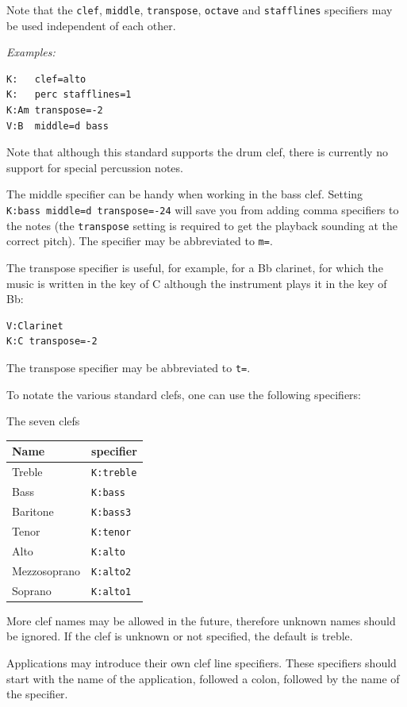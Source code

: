 \documentclass[oneside]{book}
\begin{document}
Note that the \texttt{clef}, \texttt{middle}, \texttt{transpose},
\texttt{octave} and \texttt{stafflines} specifiers may be used
independent of each other.

\emph{Examples:}

\begin{verbatim}
K:   clef=alto
K:   perc stafflines=1
K:Am transpose=-2
V:B  middle=d bass
\end{verbatim}

Note that although this standard supports the drum clef, there is
currently no support for special percussion notes.

The middle specifier can be handy when working in the bass clef. Setting
\texttt{K:bass\ middle=d\ transpose=-24} will save you from adding comma
specifiers to the notes (the \texttt{transpose} setting is required to
get the playback sounding at the correct pitch). The specifier may be
abbreviated to \texttt{m=}.

The transpose specifier is useful, for example, for a Bb clarinet, for
which the music is written in the key of C although the instrument plays
it in the key of Bb:

\begin{verbatim}
V:Clarinet
K:C transpose=-2
\end{verbatim}

The transpose specifier may be abbreviated to \texttt{t=}.

To notate the various standard clefs, one can use the following
specifiers:

The seven clefs

\begin{longtable}[]{@{}ll@{}}
\toprule
Name & specifier\tabularnewline
\midrule
\endhead
Treble & \texttt{K:treble}\tabularnewline
Bass & \texttt{K:bass}\tabularnewline
Baritone & \texttt{K:bass3}\tabularnewline
Tenor & \texttt{K:tenor}\tabularnewline
Alto & \texttt{K:alto}\tabularnewline
Mezzosoprano & \texttt{K:alto2}\tabularnewline
Soprano & \texttt{K:alto1}\tabularnewline
\bottomrule
\end{longtable}

More clef names may be allowed in the future, therefore unknown names
should be ignored. If the clef is unknown or not specified, the default
is treble.

Applications may introduce their own clef line specifiers. These
specifiers should start with the name of the application, followed a
colon, followed by the name of the specifier.
\end{document}
